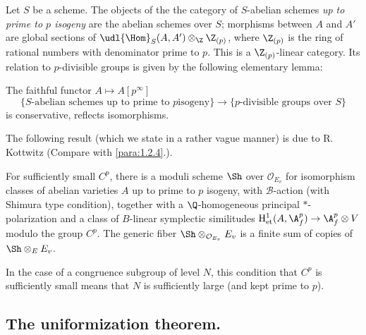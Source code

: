 \begin{para}\label{para:7.1.3} Let $S$ be a scheme. The objects of the the
 category of $S$-abelian schemes {\it up to prime to $p$ 
isogeny} are the abelian schemes over $S$; morphisms between $A $ and
$A'$ are global sections of $ \udl{\Hom}_S(A, A')\otimes_{\Z}\Z_{(p)}$,
where $\Z_{(p)}$ is the ring of rational numbers with denominator prime
to $p$. This is a $\Z_{(p)}$-linear category. Its relation to
$p$-divisible groups is given by the following elementary lemma:
\end{para}

\begin{lem}\label{lem:7.1.4} The faithful functor $A\mapsto A[p^\infty]$
\begin{equation*}
 \{\text{$S$-abelian schemes up to prime to $p$
  isogeny}\}\rightarrow \{\text{$p$-divisible groups over $S$}\}
\end{equation*}
is conservative, \ie reflects isomorphisms.
 


\end{lem}
The following result (which we state in a rather vague manner) is due to
R. Kottwitz \cite{possvoff} (Compare with \ref{para:1.2.4}.).

\begin{pro}\label{pro:7.1.5}
 For sufficiently small $C^p$, there is a moduli scheme $\Sh$ over
 $\mathcal{O}_{E_v}$ for isomorphism classes of abelian 
 varieties $A$ up to prime to $p$ isogeny, with $\mathcal{B}$-action 
 (with Shimura type condition), together with a $\Q$-homogeneous
 principal $\ast$-polarization and a class of $B$-linear symplectic
 similitudes $\mathrm{H}^1_{\mathrm{et}}(A,\A_f^p)\rightarrow \A_f^p\otimes V$
 modulo the group $C^p$. The generic fiber $\Sh
 \otimes_{\mathcal{O}_{E_v}}E_v$ is a finite sum of copies of
 $\Sh\otimes_E {E_v}$.
\end{pro}

In the case of a congruence subgroup of level $N$, this condition that
$C^p$ is sufficiently small means that $N$ is sufficiently large (and
kept prime to $p$).

\subsection{The uniformization theorem.}\label{sub:7.2}

